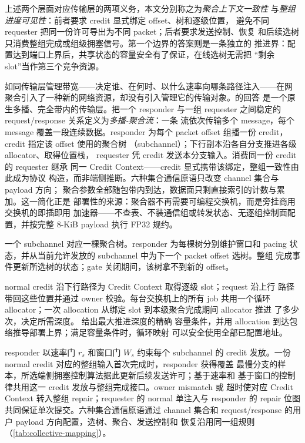 上述两个层面对应传输层的两项义务，本文分别称之为\emph{聚合上下文一致性}
与\emph{整组进度可见性}：前者要求 credit 显式绑定 offset、树和逐级位置，
避免不同 requester 把同一份许可导出为不同 packet；后者要求发送控制、恢复
和后续选树只消费整组完成或组级拥塞信号。第一个边界的答案则是一条独立的
推进界：配置达到端口上界后，共享状态的容量安全有了保证，在线选树无需把
``剩余 slot''当作第三个竞争资源。

如同传输层管理带宽——决定谁、在何时、以什么速率向哪条路径注入——在网
聚合引入了一种新的网络资源，却没有引入管理它的传输对象。\sysname 的回答
是一个原生多播、完全带内的传输层。\sysname 把一个 responder 与一组
requester 之间稳定的 request/response 关系定义为\emph{多播-聚合流}：一条
流依次传输多个 message，每个 message 覆盖一段连续数据。responder 为每个
packet offset 组播一份 credit，credit 指定该 offset 使用的聚合树
（subchannel）；下行副本沿各自分支推进各级 allocator、取得位置栈，
requester 凭 credit 发送本分支输入。消费同一份 credit 的 requester 继承
同一 Credit Context——credit 显式携带该绑定，整组一致性由此成为协议
构造，而非端侧推断。六种集合通信原语只改变 channel 集合与 payload 方向；
聚合参数全部随包带内到达，数据面只剩直接索引的计数与累加。这一简化正是
部署性的来源：聚合器不再需要可编程交换机，而是旁挂商用交换机的即插即用
加速器——不查表、不装通信组或转发状态、无逐组控制面配置，并按完整
8-KiB payload 执行 FP32 规约。

一个 subchannel 对应一棵聚合树。responder 为每棵树分别维护窗口和 pacing
状态，并从当前允许发放的 subchannel 中为下一个 packet offset 选树。整组
完成事件更新所选树的状态；gate 关闭期间，该树拿不到新的 offset。

normal credit 沿下行路径为 Credit Context 取得逐级 slot；request 沿上行
路径带回这些位置并通过 owner 校验。每台交换机上的所有 job 共用一个循环
allocator；一次 allocation 从绑定 slot 到本级聚合完成期间 allocator 推进
了多少次，决定所需深度。 给出最大推进深度的精确
容量条件，并用 allocation 到达包络推导部署上界；满足容量条件时，循环映射
可以安全使用全部已配置地址。

responder 以速率门 $r_s$ 和窗口门 $W_s$ 约束每个 subchannel 的 credit
发放。一份 normal credit 对应的整组输入首次完成时，responder 获得覆盖
最慢分支的样本，所选端侧拥塞控制算法据此更新后续发送许可；基于速率和
基于窗口的控制律共用这一 credit 发放与整组完成接口。owner mismatch 或
超时使对应 Credit Context 转入整组 repair；requester 的 normal 单注入与
responder 的 repair 位图共同保证单次提交。六种集合通信原语通过 channel
集合和 request/response 的用户 payload 方向配置，选树、聚合、发送控制和
恢复沿用同一组规则（\cref{tab:collective-mapping}）。


